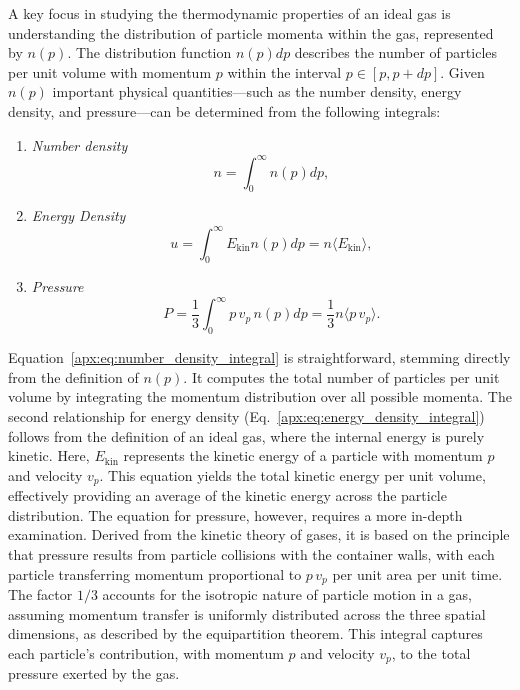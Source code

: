 \documentclass[main.tex]{subfiles}
\begin{document}
A key focus in studying the thermodynamic properties of an ideal gas is understanding the distribution of particle momenta within the gas, represented by $n(p)$. The distribution function $n(p)dp$ describes the number of particles per unit volume with momentum $p$ within the interval $p \in [p, p+dp]$. Given $n(p)$ important physical quantities---such as the number density, energy density, and pressure---can be determined from the following integrals:
\begin{enumerate}
    \item \textit{Number density}
        \begin{equation}\label{apx:eq:number_density_integral}
            n = \int_{0}^{\infty} n(p) dp,
        \end{equation}
        
    \item \textit{Energy Density}
        \begin{equation}\label{apx:eq:energy_density_integral}
            u = \int_{0}^{\infty} E_{\text{kin}} n(p) dp = n \langle E_{\text{kin}} \rangle,
        \end{equation}
        
    \item \textit{Pressure}
        \begin{equation}\label{apx:eq:pressure_integral} 
            P = \frac{1}{3}\int_{0}^{\infty} p \,v_p \,n(p) dp = \frac{1}{3} n \langle p \,v_p \rangle.
        \end{equation}
\end{enumerate}
Equation~\eqref{apx:eq:number_density_integral}  is straightforward, stemming directly from the definition of $n(p)$. It computes the total number of particles per unit volume by integrating the momentum distribution over all possible momenta.
The second relationship for energy density (Eq.~\eqref{apx:eq:energy_density_integral}) follows from the definition of an ideal gas, where the internal energy is purely kinetic. Here, $E_\mathrm{kin}$ represents the kinetic energy of a particle with momentum $p$ and velocity $v_p$. This equation yields the total kinetic energy per unit volume, effectively providing an average of the kinetic energy across the particle distribution. The equation for pressure, however, requires a more in-depth examination. Derived from the kinetic theory of gases, it is based on the principle that pressure results from particle collisions with the container walls, with each particle transferring momentum proportional to $p\,v_p$ per unit area per unit time. The factor $1/3$ accounts for the isotropic nature of particle motion in a gas, assuming momentum transfer is uniformly distributed across the three spatial dimensions, as described by the equipartition theorem. This integral captures each particle's contribution, with momentum $p$ and velocity $v_p$, to the total pressure exerted by the gas.
\end{document}

